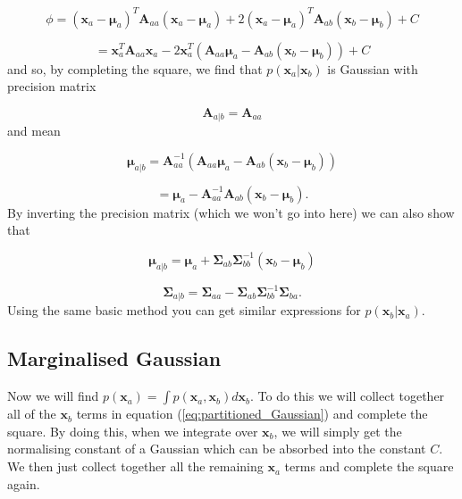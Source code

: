 \documentclass[a4paper, 11pt]{article}
\begin{document}
\begin{equation}
\phi = (\boldsymbol{x}_a-\boldsymbol{\mu}_a)^T \boldsymbol{A}_{aa} (\boldsymbol{x}_a-\boldsymbol{\mu}_a)
+ 2 (\boldsymbol{x}_a-\boldsymbol{\mu}_a)^T \boldsymbol{A}_{ab} (\boldsymbol{x}_b-\boldsymbol{\mu}_b)  + C
\end{equation}

\begin{equation}
= \boldsymbol{x}_a^T \boldsymbol{A}_{aa} \boldsymbol{x}_a - 2 \boldsymbol{x}_a^T \left( \boldsymbol{A}_{aa} \boldsymbol{\mu}_a - \boldsymbol{A}_{ab}(\boldsymbol{x}_b-\boldsymbol{\mu}_b) \right) + C
\end{equation}
and so, by completing the square, we find that $p(\boldsymbol{x}_a|\boldsymbol{x}_b)$ is Gaussian with precision matrix

\begin{equation}
\boldsymbol{A}_{a|b} = \boldsymbol{A}_{aa}
\end{equation}
and mean

\begin{equation}
\boldsymbol{\mu}_{a|b} = \boldsymbol{A}^{-1}_{aa} \left( \boldsymbol{A}_{aa} \boldsymbol{\mu}_a - \boldsymbol{A}_{ab}(\boldsymbol{x}_b-\boldsymbol{\mu}_b) \right)
\end{equation}

\begin{equation}
= \boldsymbol{\mu}_a - \boldsymbol{A}_{aa}^{-1}\boldsymbol{A}_{ab}(\boldsymbol{x}_b-\boldsymbol{\mu}_b).
\end{equation}
By inverting the precision matrix (which we won't go into here) we can also show that

\begin{equation}
\boldsymbol{\mu}_{a|b} = \boldsymbol{\mu}_a + \boldsymbol{\Sigma}_{ab} \boldsymbol{\Sigma}_{bb}^{-1} (\boldsymbol{x}_b-\boldsymbol{\mu}_b)
\end{equation}

\begin{equation}
\boldsymbol{\Sigma}_{a|b} = \boldsymbol{\Sigma}_{aa} - \boldsymbol{\Sigma}_{ab}\boldsymbol{\Sigma}_{bb}^{-1}\boldsymbol{\Sigma}_{ba}.
\end{equation}
Using the same basic method you can get similar expressions for $p(\boldsymbol{x}_b|\boldsymbol{x}_a)$.

\subsection{Marginalised Gaussian}
Now we will find $p(\boldsymbol{x}_a) = \int p(\boldsymbol{x}_a,\boldsymbol{x}_b) d \boldsymbol{x}_b$. To do this we will collect together all of the $\boldsymbol{x}_b$ terms in equation (\ref{eq:partitioned_Gaussian}) and complete the square. By doing this, when we integrate over $\boldsymbol{x}_b$, we will simply get the normalising constant of a Gaussian which can be absorbed into the constant $C$. We then just collect together all the remaining $\boldsymbol{x}_a$ terms and complete the square again.\\
\end{document}
